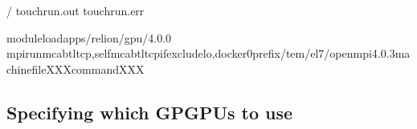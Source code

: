 \documentclass[a4paper,11pt,english]{sphinxmanual}
\begin{document}
\begin{sphinxVerbatim}[commandchars=\\\{\}]
/
touchrun.out
touchrun.err

moduleloadapps/relion/gpu/4.0.0
mpirun\PYGZhy{}\PYGZhy{}mcabtltcp,self\PYGZhy{}\PYGZhy{}mcabtl\PYGZus{}tcp\PYGZus{}if\PYGZus{}excludelo,docker0\PYGZhy{}\PYGZhy{}prefix/tem/el7/openmpi\PYGZhy{}4.0.3\PYGZhy{}machinefileXXXcommandXXX

\end{sphinxVerbatim}


\subsection{Specifying which GPGPUs to use}
\label{\detokenize{relion:specifying-which-gpgpus-to-use}}
\end{document}

